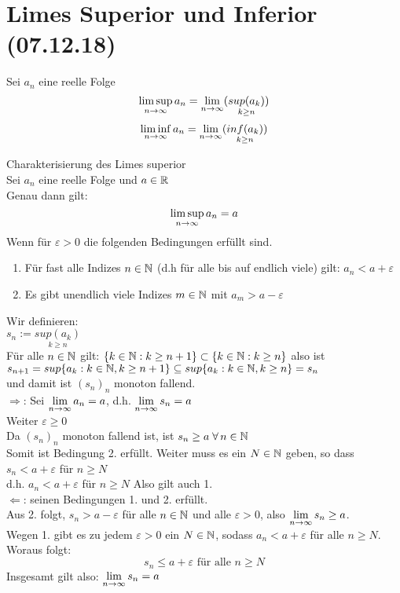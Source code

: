 \documentclass[../ana1u.tex]{subfiles}
\begin{document}
\setcounter{section}{6}

\section{Limes Superior und Inferior (07.12.18)}
\begin{defi}
    Sei \(a_n \) eine reelle Folge
    \[\limsup\limits_{n\rightarrow\infty} a_n = \lim\limits_{n\rightarrow\infty} (\underset{k \geq n}{sup(a_k)}) \]
    \[\liminf\limits_{n\rightarrow\infty} a_n = \lim\limits_{n\rightarrow\infty} (\underset{k \geq n}{inf(a_k)}) \]
\end{defi}
\begin{satz}
    Charakterisierung des Limes superior \\
    Sei \(a_n\) eine reelle Folge und \(a \in \mathbb{R}\) \\
    Genau dann gilt:
    \[\limsup\limits_{n\rightarrow\infty} a_n = a\]
    Wenn für \(\varepsilon > 0\) die folgenden Bedingungen erfüllt sind.
    \begin{enumerate}
        \item Für fast alle Indizes \(n \in \mathbb{N}\) (d.h für alle bis auf endlich viele) gilt: 
        \(a_n < a+ \varepsilon\)
        \item Es gibt unendlich viele Indizes \(m \in \mathbb{N}\) mit \(a_m > a - \varepsilon\)
    \end{enumerate}
\end{satz}
\begin{bew}
    Wir definieren: \\
    \(s_n := \underset{k \geq n}{sup(a_k)} \) \\
    Für alle \(n \in \mathbb{N}\) gilt: \(\{k \in \mathbb{N}: k \geq n+1\} \subset \{k \in \mathbb{N}: k \geq n\}\) 
    also ist \\
    \(s_{n+1} = sup\{a_k: k \in \mathbb{N}, k \geq n+1\} \subseteq sup\{a_k: k \in \mathbb{N}, k \geq n\} 
    = s_n \) \\
    und damit ist \((s_n)_n\) monoton fallend. \\
    \(\Rightarrow \): Sei \(\lim\limits_{n\rightarrow\infty} a_n = a \), d.h. \(\lim\limits_{n\rightarrow\infty} s_n = a \) \\
    Weiter \(\varepsilon \geq 0 \) \\
    Da \((s_n)_n \) monoton fallend ist, ist \(s_n \geq a \; \forall \, n \in \mathbb{N} \) \\
    Somit ist Bedingung 2. erfüllt. Weiter muss es ein \(N \in \mathbb{N}\) geben, so dass 
    \(s_n < a + \varepsilon \) für \(n \geq N \) \\
    d.h. \(a_n < a + \varepsilon \) für \(n \geq N \) Also gilt auch 1. \\
    \(\Leftarrow \): seinen Bedingungen 1. und 2. erfüllt. \\
    Aus 2. folgt, \(s_n > a - \varepsilon \) für alle \(n \in \mathbb{N} \) und alle 
    \(\varepsilon > 0 \), also \(\lim\limits_{n\rightarrow\infty} s_n \geq a \). \\
    Wegen 1. gibt es zu jedem \(\varepsilon > 0 \) ein \(N \in \mathbb{N} \), sodass 
    \(a_n < a + \varepsilon \) für alle \(n \geq N \). \\
    Woraus folgt:
    \[s_n \leq a + \varepsilon \text{ für alle } n \geq N\]
    Insgesamt gilt also: \(\lim\limits_{n\rightarrow\infty} s_n = a\)\\
\end{bew}
\end{document}
